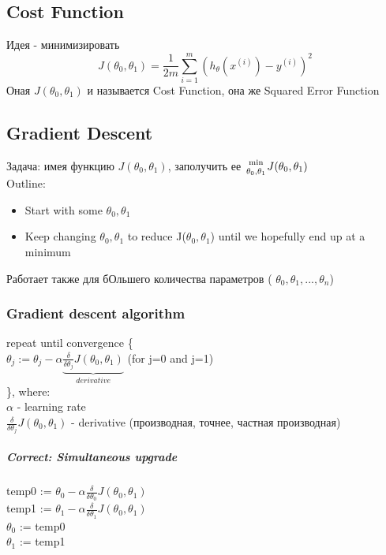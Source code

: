 \documentclass{scrartcl}
\begin{document}
\subsection {Cost Function}
\label{2-2}
Идея - минимизировать \[ J(\theta_0, \theta_1) = \frac{1}{2m}
\sum_{i=1}^m\left( h_\theta (x^{(i)}) - y^{(i)} \right)^2
\]
Оная $J(\theta_0, \theta_1)$ и называется Cost Function, она же
Squared Error Function

\subsection {Gradient Descent}
\label {2-5}
Задача: имея функцию $J(\theta_0, \theta_1)$, заполучить ее
${\min \atop \theta_0, \theta_1} J(\theta_0, \theta_1)$ \\
Outline:
\begin {itemize}
\item Start with some $\theta_0, \theta_1$
\item Keep changing $\theta_0, \theta_1$ to reduce J($\theta_0,
  \theta_1$) until we hopefully end up at a minimum
\end{itemize}
Работает также для бОльшего количества параметров ( $\theta_0,
\theta_1,..., \theta_n$)
\subsubsection {Gradient descent algorithm}
repeat until convergence \{ \\
$\theta_j := \theta_j - {\alpha} \underbrace{ \frac {\delta}{\delta
    \theta_j} J(\theta_0,
  \theta_1)}_{derivative}$ (for j=0 and j=1) \\
\}, where: \\
$\alpha$ - learning rate \\
$\frac {\delta}{\delta \theta_j} J(\theta_0, \theta_1)$ - derivative
(производная, точнее, частная производная)

\subparagraph {Correct: Simultaneous upgrade}

temp0 := $\theta_0 - \alpha \frac {\delta}{\delta \theta_0}
J(\theta_0,
\theta_1)$ \\
temp1 := $\theta_1 - \alpha \frac {\delta}{\delta \theta_1}
J(\theta_0,
\theta_1)$ \\
$\theta_0$ := temp0 \\
$\theta_1$ := temp1 \\
\end{document}
